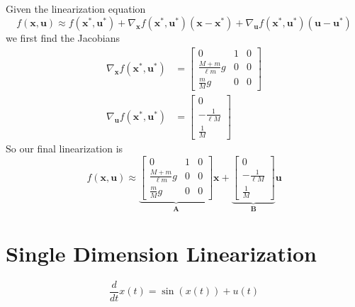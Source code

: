 \documentclass[]{article}
\newcommand{\diff}[1]{\frac{d}{d #1}}
\begin{document}
\subsection{}

Given the linearization equation
\begin{equation}
	f(\bm{x}, \bm{u}) \approx f(\bm{x}^\ast, \bm{u}^\ast) + \nabla_{\bm{x}} f(\bm{x}^\ast, \bm{u}^\ast) (\bm{x} - \bm{x}^\ast) + \nabla_{\bm{u}} f(\bm{x}^\ast, \bm{u}^\ast) (\bm{u} - \bm{u}^\ast)
\end{equation}
we first find the Jacobians
\begin{align}
	\nabla_{\bm{x}} f(\bm{x}^\ast, \bm{u}^\ast) &=
	\begin{bmatrix}
		0 & 1 & 0 \\
		\frac{M+m}{\ell m} g & 0 & 0 \\
		\frac{m}{M} g & 0 & 0
	\end{bmatrix} \\
	\nabla_{\bm{u}} f(\bm{x}^\ast, \bm{u}^\ast) &=
	\begin{bmatrix}
	0 \\
	-\frac{1}{\ell M} \\
	\frac{1}{M}
	\end{bmatrix}
\end{align}
So our final linearization is
\begin{equation}
	f(\bm{x}, \bm{u}) \approx \underbrace{\begin{bmatrix}
		0 & 1 & 0 \\
		\frac{M+m}{\ell m} g & 0 & 0 \\
		\frac{m}{M} g & 0 & 0
	\end{bmatrix}}_{\bm{A}} \bm{x} + \underbrace{\begin{bmatrix}
	0 \\
	-\frac{1}{\ell M} \\
	\frac{1}{M}
	\end{bmatrix}}_{\bm{B}} \bm{u}
\end{equation}

\section{Single Dimension Linearization}

\begin{equation}
	\diff{t} x(t) = \sin(x(t)) + u(t)
\end{equation}

\subsection{}
\end{document}
